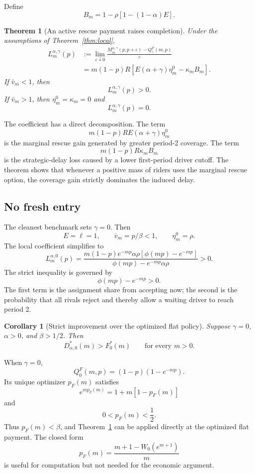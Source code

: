 \documentclass[11pt]{article}
\newtheorem{theorem}{Theorem}
\newtheorem{corollary}{Corollary}
\theoremstyle{definition}
\theoremstyle{remark}
\begin{document}
Define
\[
  B_m=1-\rho[1-(1-\alpha)E].
\]

\begin{theorem}[An active rescue payment raises completion]
\label{thm:positive}
Under the assumptions of Theorem~\ref{thm:local},
\[
\begin{aligned}
L_m^{\alpha,\gamma}(p)
&:=
\lim_{\varepsilon\downarrow0}
\frac{
\underline M_m^{\alpha,\gamma}(p,p+\varepsilon)
-Q_\gamma^F(m,p)
}{\varepsilon}\\
&=
m(1-p)R
\left[
E(\alpha+\gamma)\eta_m^0-\kappa_mB_m
\right].
\end{aligned}
\]
If \(\bar v_m<1\), then
\[
  L_m^{\alpha,\gamma}(p)>0.
\]
If \(\bar v_m>1\), then \(\eta_m^0=\kappa_m=0\) and
\[
  L_m^{\alpha,\gamma}(p)=0.
\]
\end{theorem}

The coefficient has a direct decomposition.  The term
\[
  m(1-p)RE(\alpha+\gamma)\eta_m^0
\]
is the marginal rescue gain generated by greater period-2 coverage.  The term
\[
  m(1-p)R\kappa_mB_m
\]
is the strategic-delay loss caused by a lower first-period driver cutoff.  The
theorem shows that whenever a positive mass of riders uses the marginal rescue
option, the coverage gain strictly dominates the induced delay.

\subsection{No fresh entry}

The cleanest benchmark sets \(\gamma=0\).  Then
\[
  E=\ell=1,\qquad
  \bar v_m=p/\beta<1,\qquad
  \eta_m^0=\rho.
\]
The local coefficient simplifies to
\[
L_m^{\alpha,0}(p)
=
\frac{
m(1-p)e^{-mp}\alpha\rho
[\phi(mp)-e^{-mp}]
}{
\phi(mp)-e^{-mp}\alpha\rho
}>0.
\]
The strict inequality is governed by
\[
  \phi(mp)-e^{-mp}>0.
\]
The first term is the assignment share from accepting now; the second is the
probability that all rivals reject and thereby allow a waiting driver to reach
period 2.

\begin{corollary}[Strict improvement over the optimized flat policy]
\label{cor:optimalflat}
Suppose \(\gamma=0\), \(\alpha>0\), and \(\beta>1/2\).  Then
\[
  D_{\alpha,0}^*(m)>F_0^*(m)
  \qquad\text{for every }m>0.
\]
\end{corollary}

When \(\gamma=0\),
\[
  Q_0^F(m,p)=(1-p)(1-e^{-mp}).
\]
Its unique optimizer \(p_F(m)\) satisfies
\[
  e^{mp_F(m)}=1+m[1-p_F(m)]
\]
and
\[
  0<p_F(m)<\frac12.
\]
Thus \(p_F(m)<\beta\), and Theorem~\ref{thm:positive} can be applied directly
at the optimized flat payment.  The closed form
\[
  p_F(m)
  =
  \frac{m+1-W_0(e^{m+1})}{m}
\]
is useful for computation but not needed for the economic argument.
\end{document}
